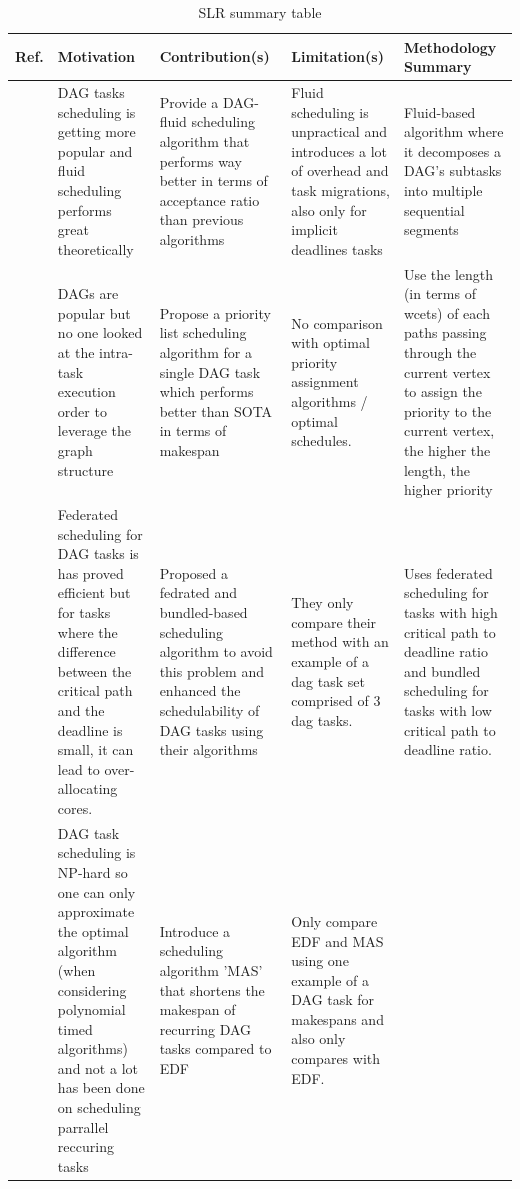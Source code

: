 \begin{table}
    \centering
    \caption{SLR summary table}
    \label{tab:slt_sum_table}
    \begin{tabular}[]{|p{0.15in}|p{1.6in}|p{1.6in}|p{1.6in}|p{1.6in}|}
        \hline
        \textbf{Ref.} & \textbf{Motivation} & \textbf{Contribution(s)} & \textbf{Limitation(s)} & \textbf{Methodology Summary}\\
        \hline
        \cite{guan2021DAGfluid} & DAG tasks scheduling is getting more popular and fluid scheduling performs great theoretically & Provide a DAG-fluid scheduling algorithm
        that performs way better in terms of acceptance ratio than previous algorithms & Fluid scheduling is unpractical and introduces a lot of overhead and task migrations, also only for implicit deadlines tasks
        & Fluid-based algorithm where it decomposes a DAG's subtasks into multiple sequential segments\\
        \hline
        \cite{He2019DagIntra} & DAGs are popular but no one looked at the intra-task execution order to leverage the graph structure & Propose a priority list scheduling algorithm for a single DAG task
        which performs better than SOTA in terms of makespan & No comparison with optimal priority assignment algorithms / optimal schedules.  & Use the length (in terms of wcets) of each paths passing through the current vertex to assign the priority to the current vertex,
        the higher the length, the higher priority \\
        \hline
        \cite{Kobayashi2023FedBundledDagsched} & Federated scheduling for DAG tasks is has proved efficient but 
        for tasks where the difference between the critical path and the deadline is small, it
        can lead to over-allocating cores.  & Proposed a fedrated and bundled-based scheduling algorithm to avoid this problem and enhanced the schedulability of DAG tasks using their algorithms & They only compare their method with an example of a dag task set comprised of 3 dag tasks. & Uses federated scheduling for tasks with high critical path to deadline ratio and bundled scheduling for tasks with low critical path to deadline ratio. \\
        \hline
        \cite{Xiao2019} & DAG task scheduling is NP-hard so one can only approximate the optimal algorithm (when considering polynomial timed algorithms)
        and not a lot has been done on scheduling parrallel reccuring tasks & Introduce a scheduling algorithm 'MAS' that shortens the makespan of recurring DAG tasks compared to EDF & Only compare EDF and MAS using one example of a DAG task for makespans and also only compares with EDF.

\end{tabular}
\end{table}
